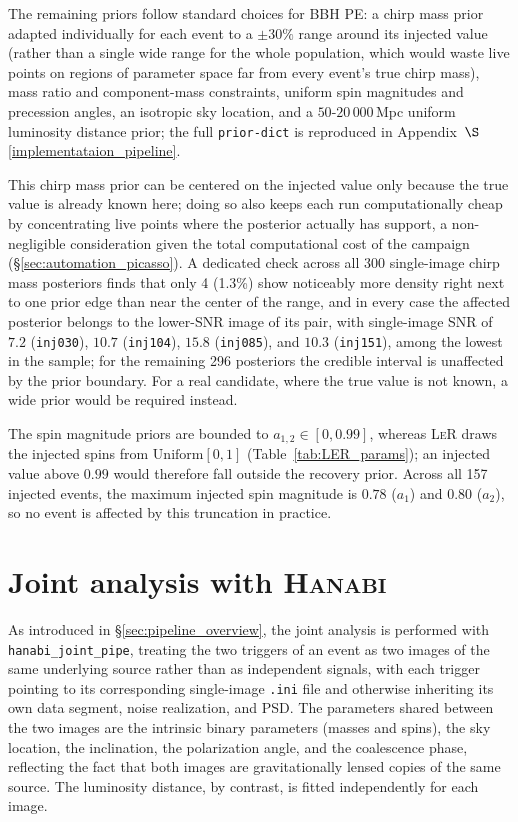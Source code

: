 The remaining priors follow standard choices for BBH PE: a chirp mass prior adapted individually for each event to a $\pm30\%$ range around its injected value (rather than a single wide range for the whole population, which would waste live points on regions of parameter space far from every event's true chirp mass), mass ratio and component-mass constraints, uniform spin magnitudes and precession angles, an isotropic sky location, and a $50$-$20\,000$\,Mpc uniform luminosity distance prior; the full \texttt{prior-dict} is reproduced in Appendix~$\S$\ref{implementataion_pipeline}.

This chirp mass prior can be centered on the injected value only because the true value is already known here; doing so also keeps each run computationally cheap by concentrating live points where the posterior actually has support, a non-negligible consideration given the total computational cost of the campaign (\S\ref{sec:automation_picasso}). A dedicated check across all 300 single-image chirp mass posteriors finds that only 4 (1.3\%) show noticeably more density right next to one prior edge than near the center of the range, and in every case the affected posterior belongs to the lower-SNR image of its pair, with single-image SNR of $7.2$ (\texttt{inj030}), $10.7$ (\texttt{inj104}), $15.8$ (\texttt{inj085}), and $10.3$ (\texttt{inj151}), among the lowest in the sample; for the remaining 296 posteriors the credible interval is unaffected by the prior boundary. For a real candidate, where the true value is not known, a wide prior would be required instead.

The spin magnitude priors are bounded to $a_{1,2}\in[0,0.99]$, whereas \textsc{LeR} draws the injected spins from $\mathrm{Uniform}[0,1]$ (Table~\ref{tab:LER_params}); an injected value above $0.99$ would therefore fall outside the recovery prior. Across all 157 injected events, the maximum injected spin magnitude is $0.78$ ($a_1$) and $0.80$ ($a_2$), so no event is affected by this truncation in practice.

\section{Joint analysis with \textsc{Hanabi}}
\label{sec:hanabi_joint}

As introduced in \S\ref{sec:pipeline_overview}, the joint analysis is performed with \texttt{hanabi\_joint\_pipe}, treating the two triggers of an event as two images of the same underlying source rather than as independent signals, with each trigger pointing to its corresponding single-image \texttt{.ini} file and otherwise inheriting its own data segment, noise realization, and PSD. The parameters shared between the two images are the intrinsic binary parameters (masses and spins), the sky location, the inclination, the polarization angle, and the coalescence phase, reflecting the fact that both images are gravitationally lensed copies of the same source. The luminosity distance, by contrast, is fitted independently for each image.

